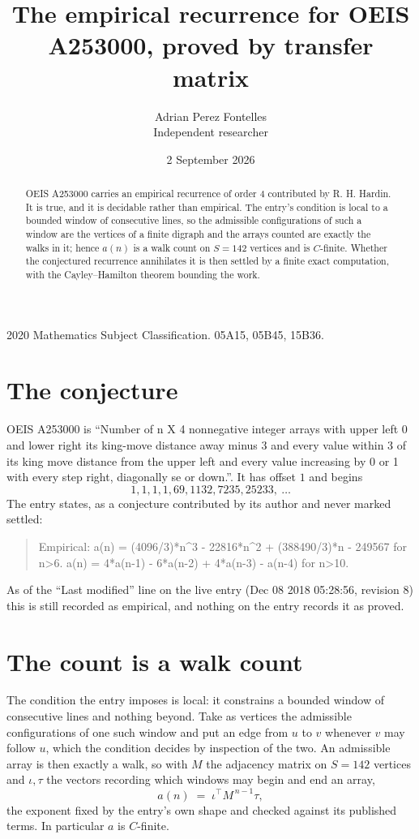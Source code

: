 \documentclass[11pt,a4paper]{article}
\title{The empirical recurrence for OEIS A253000, proved by transfer matrix}
\author{Adrian Perez Fontelles\\ \small Independent researcher}
\date{2 September 2026}
\theoremstyle{plain}
\theoremstyle{definition}
\begin{document}
\maketitle

\begin{abstract}
OEIS A253000 carries an empirical recurrence of order $4$ contributed by R. H. Hardin. It is
true, and it is decidable rather than empirical. The entry's condition is local to a bounded window of consecutive lines, so
the admissible configurations of such a window are the vertices of a finite digraph and the
arrays counted are exactly the walks in it; hence $a(n)$ is a walk count on $S=142$ vertices
and is $C$-finite. Whether the conjectured recurrence annihilates it is then settled by a
finite exact computation, with the Cayley--Hamilton theorem bounding the work.
\end{abstract}

\noindent\small 2020 Mathematics Subject Classification. 05A15, 05B45, 15B36.\normalsize

\section{The conjecture}

OEIS A253000 is ``Number of n X 4 nonnegative integer arrays with upper left 0 and lower right its king-move distance away minus 3 and every value within 3 of its king move distance from the upper left and every value increasing by 0 or 1 with every step right, diagonally se or down.''. It has offset $1$ and begins
\[
1, 1, 1, 1, 69, 1132, 7235, 25233,\ \dots
\]
The entry states, as a conjecture contributed by its author and never marked settled:
\begin{quote}
Empirical: a(n) = (4096/3)*n\^{}3 - 22816*n\^{}2 + (388490/3)*n - 249567 for n>6. a(n) = 4*a(n-1) - 6*a(n-2) + 4*a(n-3) - a(n-4) for n>10.
\end{quote}
As of the ``Last modified'' line on the live entry (Dec 08 2018 05:28:56, revision 8) this is still
recorded as empirical, and nothing on the entry records it as proved.

\section{The count is a walk count}

The condition the entry imposes is local: it constrains a bounded window of consecutive lines and nothing beyond. Take as
vertices the admissible configurations of one such window and put an edge from $u$ to $v$
whenever $v$ may follow $u$, which the condition decides by inspection of the two. An
admissible array is then exactly a walk, so with $M$ the adjacency matrix on $S=142$ vertices
and $\iota,\tau$ the vectors recording which windows may begin and end an array,
\[
a(n)\;=\;\iota^{\!\top}M^{\,n-1}\tau ,
\]
the exponent fixed by the entry's own shape and checked against its published terms. In
particular $a$ is $C$-finite.
\end{document}
